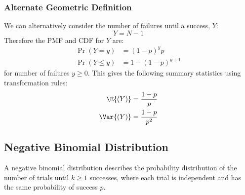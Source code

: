 \documentclass{article}
\begin{document}
\subsubsection{Alternate Geometric Definition}
We can alternatively consider the number of failures until a success, \(Y\):
\begin{equation*}
    Y = N - 1
\end{equation*}
Therefore the PMF and CDF for \(Y\) are:
\begin{align*}
    \Pr{\left( Y = y \right)}    & = \left( 1 - p \right)^y p         \\
    \Pr{\left( Y \leq y \right)} & = 1 - \left( 1 - p \right)^{y + 1}
\end{align*}
for number of failures \(y \geq 0\). This gives the following summary statistics using
transformation rules:
\begin{align*}
    \E{\left( Y \right)}   & = \frac{1 - p}{p}   \\
    \Var{\left( Y \right)} & = \frac{1 - p}{p^2}
\end{align*}
\subsection{Negative Binomial Distribution}
A negative binomial distribution describes the probability distribution of the number of trials until \(k \geq 1\)
successes, where each trial is independent and has the same probability of success \(p\).
\end{document}
